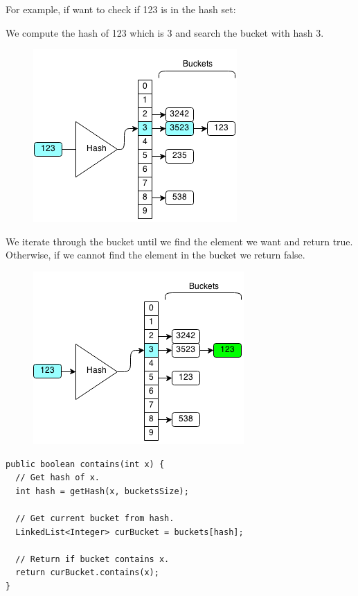 \documentclass[11pt,oneside]{book}
\makeatletter
\def\maxwidth#1{\ifdim\Gin@nat@width>#1 #1\else\Gin@nat@width\fi}
\makeatother
\begin{document}
For example, if want to check if 123 is in the hash set:

We compute the hash of 123 which is 3 and search the bucket with hash 3.

\vspace{5px}\begin{figure}[H]\centering
        \includegraphics[width=0.66\maxwidth{\textwidth}]{hashsetcontains.png}
        \end{figure}

We iterate through the bucket until we find the element we want and return true. Otherwise, if we cannot find the element in the bucket we return false.

\vspace{5px}\begin{figure}[H]\centering
        \includegraphics[width=0.66\maxwidth{\textwidth}]{hashsetcontains3.png}
        \end{figure}

\begin{lstlisting}
public boolean contains(int x) {
  // Get hash of x.
  int hash = getHash(x, bucketsSize);
  
  // Get current bucket from hash.
  LinkedList<Integer> curBucket = buckets[hash];
  
  // Return if bucket contains x.
  return curBucket.contains(x);
}
\end{lstlisting}
\end{document}

